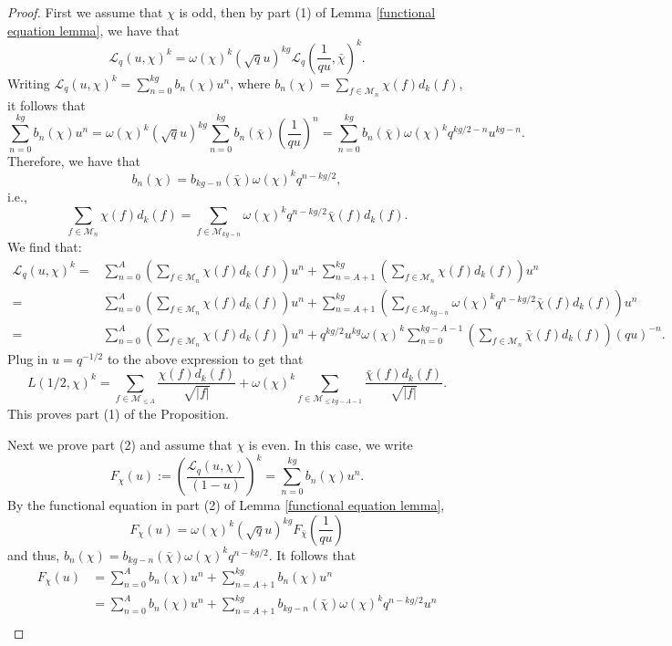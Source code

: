 \documentclass[10pt,a4paper]{amsart}
\newcommand{\cM}{\mathcal{M}}
\begin{document}
\begin{proof}
First we assume that $\chi$ is odd, then by part (1) of Lemma \ref{functional equation lemma}, we have that
$$
\mathcal{L}_{q}(u, \chi)^k=\omega(\chi)^k(\sqrt{q} u)^{kg} \mathcal{L}_{q}\left(\frac{1}{q u}, \bar{\chi}\right)^k .
$$  Writing
$
\mathcal{L}_q\left(u, \chi\right)^{k}=\sum_{n=0}^{k g} b_n(\chi) u^{n}
$,
where $b_n(\chi)=\sum_{f \in \mathcal{M}_{n}} \chi(f) d_{k}(f)$, it follows that
$$
\sum_{n=0}^{k g} b_n(\chi) u^{n}=\omega(\chi)^k (\sqrt{q} u)^{kg} \sum_{n=0}^{k g} b_n(\bar{\chi}) \left(\frac{1}{qu}\right)^n
=\sum_{n=0}^{kg} b_n(\bar{\chi}) \omega(\chi)^k q^{kg/2-n} u^{kg-n}.$$
Therefore, we have that \[b_n(\chi)=b_{kg-n}(\bar{\chi})\omega(\chi)^k q^{n-kg/2},\] i.e., 
\[\sum_{f \in \mathcal{M}_{n}} \chi(f) d_{k}(f)=\sum_{f \in \mathcal{M}_{kg-n}} \omega(\chi)^k q^{n-kg/2}\bar{\chi}(f) d_{k}(f).\]
We find that:
\[\begin{split}\mathcal{L}_{q}(u, \chi)^k=& \sum_{n=0}^{A} \left(\sum_{f \in \mathcal{M}_{n}} \chi(f)d_k(f)\right) u^n+\sum_{n=A+1}^{kg} \left(\sum_{f \in \mathcal{M}_{n}} \chi(f)d_k(f)\right) u^n\\
= & \sum_{n=0}^{A} \left(\sum_{f \in \mathcal{M}_{n}} \chi(f)d_k(f)\right) u^n+ \sum_{n=A+1}^{kg} \left(\sum_{f \in \mathcal{M}_{kg-n}} \omega(\chi)^k q^{n-kg/2}\bar{\chi}(f) d_{k}(f)\right)u^n \\
= & \sum_{n=0}^{A} \left(\sum_{f \in \mathcal{M}_{n}} \chi(f)d_k(f)\right) u^n+ q^{kg/2}u^{kg}\omega(\chi)^k\sum_{n=0}^{kg-A-1} \left(\sum_{f \in \mathcal{M}_{n}} \bar{\chi}(f)  d_{k}(f)\right)(qu)^{-n}.
\end{split}\]
Plug in $u=q^{-1/2}$ to the above expression to get that 
\[L(1/2, \chi)^k=\sum_{f\in \cM_{\leq A}}\frac{\chi(f)d_k(f)}{\sqrt{|f|}}+ \omega(\chi)^k\sum_{f\in \cM_{\leq kg-A-1}}  \frac{\bar{\chi}(f) d_{k}(f)}{\sqrt{|f|}}.\] This proves part (1) of the Proposition.
\par Next we prove part (2) and assume that $\chi$ is even. In this case, we write
$$
F_\chi(u):=\left(\frac{\mathcal{L}_q\left(u, \chi\right)}{(1-u)}\right)^{k}=\sum_{n=0}^{k g} b_n(\chi) u^{n}.
$$
By the functional equation in part (2) of Lemma \ref{functional equation lemma}, 
\[F_\chi(u)=\omega(\chi)^k (\sqrt{q} u)^{kg}F_{\bar{\chi}}\left(\frac{1}{qu}\right)\]
and thus, $b_n(\chi)=b_{kg-n}(\bar{\chi})\omega(\chi)^k q^{n-kg/2}$.
It follows that 
\begin{align*}
    F_\chi(u)&= \sum_{n=0}^{A} b_n(\chi) u^{n}+\sum_{n=A+1}^{kg} b_n(\chi) u^{n}\\
    &=\sum_{n=0}^{A} b_n(\chi) u^{n}+\sum_{n=A+1}^{kg}b_{kg-n}(\bar{\chi})\omega(\chi)^k q^{n-kg/2}u^n\\

\end{align*}
\end{proof}
\end{document}
